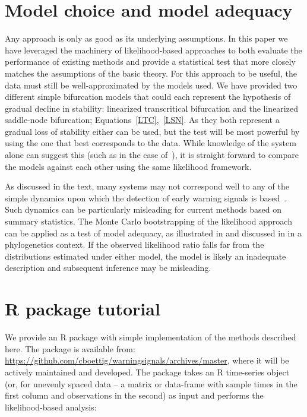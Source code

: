 \documentclass[authoryear, preprint,review,12pt]{elsarticle}
\begin{document}
\section{Model choice and model adequacy}\label{modelchoice}
Any approach is only as good as its underlying assumptions.  In this paper we have leveraged the machinery of likelihood-based approaches to both evaluate the performance of existing methods and provide a statistical test that more closely matches the assumptions of the basic theory.  For this approach to be useful, the data must still be well-approximated by the models used.  We have provided two different simple bifurcation models that could each represent the hypothesis of gradual decline in stability: linearized transcritical bifurcation and the linearized saddle-node bifurcation; Equations~\eqref{LTC},~\eqref{LSN}.  As they both represent a gradual loss of stability either can be used, but the test will be most powerful by using the one that best corresponds to the data.  While knowledge of the system alone can suggest this (such as in the case of~\citet{Drake2010}), it is straight forward to compare the models against each other using the same likelihood framework.  

As discussed in the text, many systems may not correspond well to any of the simple dynamics upon which the detection of early warning signals is based~\citep{Hastings2010}.  Such dynamics can be particularly misleading for current methods based on summary statistics.  The Monte Carlo bootstrapping of the likelihood approach can be applied as a test of model adequacy, as illustrated in \citet{Goldman1993} and discussed in \citet{Sullivan2005b} in a phylogenetics context. If the observed likelihood ratio falls far from the distributions estimated under either model, the model is likely an inadequate description and subsequent inference may be misleading.  


\section{R package tutorial}
We provide an R package with simple implementation of the methods described here.  The package is available from: \href{https://github.com/cboettig/warningsignals/archives/master}{https://github.com/cboettig/warningsignals/archives/master}, where it will be actively maintained and developed.  The package takes an R time-series object (or, for unevenly spaced data -- a matrix or data-frame with sample times in the first column and observations in the second) as input and performs the likelihood-based analysis:
\end{document}
